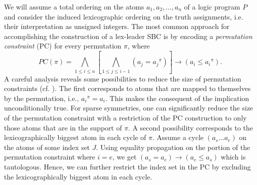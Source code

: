\documentclass[envcountsame]{llncs}
\begin{document}
We will assume a total ordering on the atoms $a_1, a_2, \dots, a_n$ of a logic program $P$ and consider the induced lexicographic ordering on the truth assignments, i.e. their interpretation as unsigned integers. The most common approach for accomplishing the construction of a lex-leader SBC is by encoding a \emph{permutation constraint} (PC) for every permutation $\pi$, where
\[
PC(\pi) = \bigwedge_{1 \leq i \leq n} \left\lbrack \bigwedge_{1 \leq j \leq i-1} (a_j = {a_j}^\pi) \right\rbrack \rightarrow(a_i \leq {a_i}^\pi).
\]
A careful analysis reveals some possibilities to reduce the size of permutation constraints (cf. \cite{sa09a}). The first corresponds to atoms that are mapped to themselves by the permutation, i.e., ${a_i}^\pi = a_i$. This makes the consequent of the implication unconditionally true. For sparse symmetries, one can significantly reduce the size of the permutation constraint with a restriction of the PC construction to only those atoms that are in the support of $\pi$. A second possibility corresponds to the lexicographically biggest atom in each cycle of $\pi$. Assume a cycle $(a_s \dots a_e)$ on the atoms of some index set $J$. Using equality propagation on the portion of the permutation constraint where $i=e$, we get $(a_s = a_e) \rightarrow (a_e \leq a_s)$ which is tautologous. Hence, we can further restrict the index set in the PC by excluding the lexicographically biggest atom in each cycle.
\end{document}
